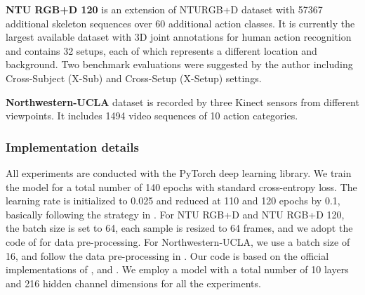 \documentclass[10pt,twocolumn,letterpaper]{article}
\begin{document}
\noindent
\textbf{NTU RGB+D 120} \cite{liu2019ntu} is an extension of NTURGB+D dataset with 57367 additional skeleton sequences over 60 additional action classes.
It is currently the largest available dataset with 3D joint annotations for human action recognition and contains 32 setups, each of which represents a different location and background. Two benchmark evaluations were suggested by the author including Cross-Subject (X-Sub) and Cross-Setup (X-Setup) settings. 


\noindent
\textbf{Northwestern-UCLA} \cite{wang2014cross} dataset is
recorded by three Kinect sensors from different viewpoints. It includes 1494 video sequences of 10 action categories. 


\subsubsection{Implementation details}
\label{implement}
All experiments are conducted with the PyTorch \cite{paszke2019pytorch} deep learning library.
We train the model for a total number of 140 epochs with standard cross-entropy loss.
The learning rate is initialized to 0.025 and reduced at 110 and 120 epochs by 0.1, basically following the strategy in \cite{chi2022infogcn}.
For NTU RGB+D and NTU RGB+D 120, the batch size is set to 64, each sample is resized to 64 frames, and we adopt the code of \cite{zhang2020semantics} for data pre-processing.
For Northwestern-UCLA, we use a batch size of 16, and
follow the data pre-processing in \cite{cheng2020skeleton,chen2021channel}.
Our code is based on the official implementations of \cite{touvron2021training}, \cite{chen2021channel} and \cite{zhang2020semantics}. We employ a model with a total number of 10 layers and 216 hidden channel dimensions for all the experiments.
\end{document}
